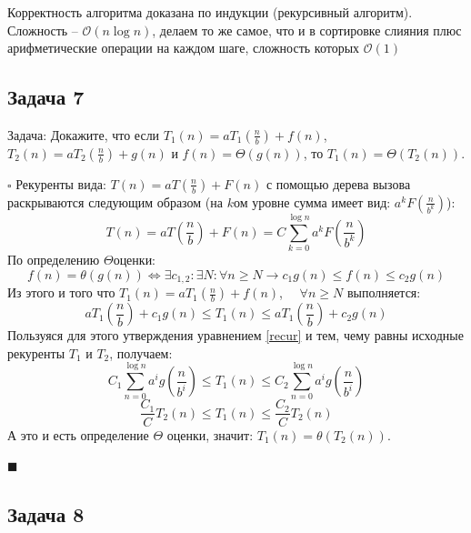 \documentclass[a4paper,12pt]{article} %
\begin{document}
Корректность алгоритма доказана по индукции (рекурсивный алгоритм). Сложность -- $\mathcal{O}(n\log{}n)$, делаем то же самое, что и в сортировке слияния плюс арифметические операции на каждом шаге, сложность которых $\mathcal{O}(1)$

\subsection*{Задача 7}
Задача: Докажите, что если $T_1(n) = aT_1(\frac{n}{b})+ f(n)$,\; $T_2(n) = aT_2(\frac{n}{b})+ g(n)$ и $f(n) = \Theta(g(n))$, то $T_1(n) = \Theta(T_2(n))$.

$\square$ Рекуренты вида: $T(n) = aT(\frac{n}{b})+ F(n)$ с помощью дерева вызова раскрываются следующим образом (на $ k $ом уровне сумма имеет вид: $a^kF(\frac{n}{b^k})$): 
\begin{equation} \label{recur}
T(n) = aT(\frac{n}{b})+ F(n) = C \sum_{k=0}^{\log n} a^{k} F\left(\frac{n}{b^k}\right)
\end{equation}
По определению $\Theta$оценки:
$$
f(n)=\theta(g(n)) \Longleftrightarrow \exists c_{1,2}: \exists N: \forall n \geq N \rightarrow c_1 g(n)\leqslant f(n) \leqslant c_{2} g(n)
$$
Из этого и того что $T_1(n) = aT_1(\frac{n}{b})+ f(n)$,$ \quad $ $ \forall n \geq N $ выполняется:
$$
a T_{1}\left(\frac{n}{b}\right)+c_1 g(n) \leq T_{1}(n) \leq a T_{1}\left(\frac{n}{b}\right)+c_{2} g(n)
$$
Пользуяся для этого утверждения уравнением \eqref{recur} и тем, чему равны исходные рекуренты $ T_1 $ и $ T_2 $, получаем:
$$
C_1\sum_{n=0}^{\log n} a^{i} g\left(\frac{n}{b^i}\right) \leq T_{1}(n) \leq C_{2} \sum_{n=0}^{\log n} a^{i} g\left(\frac{n}{b^{i}}\right)
$$
$$
\frac{C_{1}}{C} T_{2}(n) \leq T_{1}(n) \leq \frac{C_{2}}{C} T_{2}(n) $$
А это и есть определение $ \Theta $ оценки, значит: $T_{1}(n)=\theta\left(T_{2}(n)\right)$.
\begin{flushright}
	$\blacksquare$
\end{flushright}



\subsection*{Задача 8}
\end{document}
